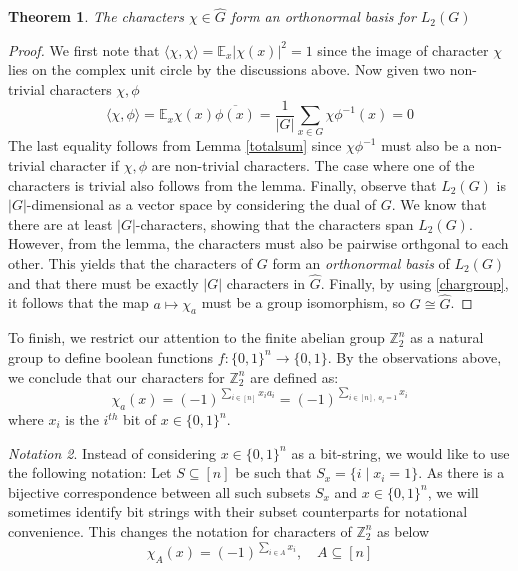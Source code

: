 \documentclass{amsart}
\newtheorem{theorem}{Theorem}[section]
\theoremstyle{definition}
\theoremstyle{remark}
\numberwithin{equation}{section}
\theoremstyle{remark}
\newtheorem{notation}[theorem]{Notation}
\begin{document}
\begin{theorem} \label{orthonormal}
  The characters $\chi \in \hat{G}$ form an orthonormal basis for $L_2(G)$
\end{theorem}
%
\begin{proof}
We first note that $\langle \chi, \chi \rangle = \mathbb{E}_x|\chi(x)|^2 = 1$ since the image of character $\chi$ lies on the complex unit circle by the discussions above. Now given two non-trivial characters $\chi, \phi$
$$ \langle \chi, \phi \rangle = \mathbb{E}_x \chi(x)\overline{\phi(x)} = \frac{1}{|G|} \sum_{x \in G} \chi\phi^{-1}(x)  = 0$$
The last equality follows from Lemma \ref{totalsum} since $\chi\phi^{-1}$ must also be a non-trivial character if $\chi, \phi$ are non-trivial characters. The case where one of the characters is trivial also follows from the lemma.
Finally, observe that $L_2(G)$ is $|G|$-dimensional as a vector space by considering the dual of $G$. We know that there are at least $|G|$-characters, showing that the characters span $L_2(G)$. However, from the lemma, the characters must also be pairwise orthgonal to each other. This yields that the characters of $G$ form an \emph{orthonormal basis} of $L_2(G)$ and that there must be exactly $|G|$ characters in $\hat{G}$. Finally, by using \ref{chargroup}, it follows that the map $a \mapsto \chi_a$ must be a group isomorphism, so $G \cong \hat{G}$.
\end{proof}

To finish, we restrict our attention to the finite abelian group $\mathbb{Z}_2^n$ as a natural group to define boolean functions $f: \{0,1\}^n \rightarrow \{0,1\}$. By the observations above, we conclude that our characters for $\mathbb{Z}_2^n$ are defined as:
%
\begin{equation}
  \chi_a(x) = (-1)^{\sum_{i \in [n]} x_ia_i} = (-1)^{\sum_{i \in [n], \; a_i = 1} x_i}
\end{equation}
where $x_i$ is the $i^{th}$ bit of $x \in \{0,1\}^n$.
%
\begin{notation}
  Instead of considering $x \in \{0,1\}^n$ as a bit-string, we would like to use the following notation: Let $S \subseteq [n]$ be such that $S_x = \{i \mid x_i = 1\}$. As there is a bijective correspondence between all such subsets $S_x$ and $x \in \{0,1\}^n$, we will sometimes identify bit strings with their subset counterparts for notational convenience. This changes the notation for characters of $\mathbb{Z}_2^n$ as below
  $$ \chi_A(x) = (-1)^{\sum_{i \in A} x_i}, \quad A \subseteq [n]$$
\end{notation}
\end{document}
